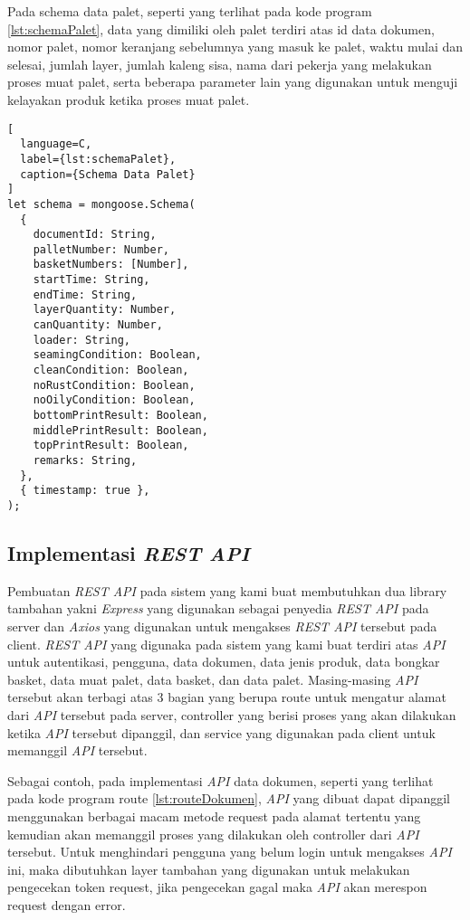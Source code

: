 Pada schema data palet, seperti yang terlihat pada kode program \ref{lst:schemaPalet}, data yang dimiliki oleh palet terdiri atas id data dokumen, nomor palet, nomor keranjang sebelumnya yang masuk ke palet, waktu mulai dan selesai, jumlah layer, jumlah kaleng sisa, nama dari pekerja yang melakukan proses muat palet, serta beberapa parameter lain yang digunakan untuk menguji kelayakan produk ketika proses muat palet.
\vspace{0.5ex}

\begin{lstlisting}[
  language=C,
  label={lst:schemaPalet},
  caption={Schema Data Palet}
]
let schema = mongoose.Schema(
  {
    documentId: String,
    palletNumber: Number,
    basketNumbers: [Number],
    startTime: String,
    endTime: String,
    layerQuantity: Number,
    canQuantity: Number,
    loader: String,
    seamingCondition: Boolean,
    cleanCondition: Boolean,
    noRustCondition: Boolean,
    noOilyCondition: Boolean,
    bottomPrintResult: Boolean,
    middlePrintResult: Boolean,
    topPrintResult: Boolean,
    remarks: String,
  },
  { timestamp: true },
);
\end{lstlisting}
\vspace{0.5ex}

\subsection{Implementasi \emph{REST API}}
\vspace{1ex}

Pembuatan \emph{REST API} pada sistem yang kami buat membutuhkan dua library tambahan yakni \emph{Express} yang digunakan sebagai penyedia \emph{REST API} pada server dan \emph{Axios} yang digunakan untuk mengakses \emph{REST API} tersebut pada client.
\emph{REST API} yang digunaka pada sistem yang kami buat terdiri atas \emph{API} untuk autentikasi, pengguna, data dokumen, data jenis produk, data bongkar basket, data muat palet, data basket, dan data palet.
Masing-masing \emph{API} tersebut akan terbagi atas 3 bagian yang berupa route untuk mengatur alamat dari \emph{API} tersebut pada server, controller yang berisi proses yang akan dilakukan ketika \emph{API} tersebut dipanggil, dan service yang digunakan pada client untuk memanggil \emph{API} tersebut.
\vspace{0.5ex}

Sebagai contoh, pada implementasi \emph{API} data dokumen, seperti yang terlihat pada kode program route \ref{lst:routeDokumen}, \emph{API} yang dibuat dapat dipanggil menggunakan berbagai macam metode request pada alamat tertentu yang kemudian akan memanggil proses yang dilakukan oleh controller dari \emph{API} tersebut.
Untuk menghindari pengguna yang belum login untuk mengakses \emph{API} ini, maka dibutuhkan layer tambahan yang digunakan untuk melakukan pengecekan token request, jika pengecekan gagal maka \emph{API} akan merespon request dengan error.
\vspace{0.5ex}

